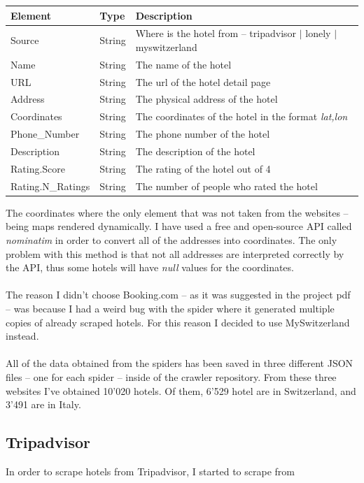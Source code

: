 \documentclass[unicode,11pt,a4paper,oneside,numbers=endperiod,openany]{scrartcl}
\begin{document}
\begin{table}[H]
	\centering
	\begin{tabular}{|l|l|l|} \hline 
		\textbf{Element} & \textbf{Type} & \textbf{Description}  \\ \hline
		Source & String & Where is the hotel from -- tripadvisor $|$ lonely $|$ myswitzerland \\
		Name & String & The name of the hotel \\
		URL & String & The url of the hotel detail page \\
		Address & String & The physical address of the hotel \\
		Coordinates & String & The coordinates of the hotel in the format \textit{lat,lon} \\
		Phone\_Number & String & The phone number of the hotel \\
		Description & String & The description of the hotel \\
		Rating.Score & String & The rating of the hotel out of 4 \\
		Rating.N\_Ratings & String & The number of people who rated the hotel \\
		\hline
	\end{tabular}
\end{table}

\noindent The coordinates where the only element that was not taken from the websites -- being maps rendered dynamically. I have used a free and open-source API called \textit{nominatim} in order to convert all of the addresses into coordinates. The only problem with this method is that not all addresses are interpreted correctly by the API, thus some hotels will have \textit{null} values for the coordinates. \\ \\
The reason I didn't choose Booking.com -- as it was suggested in the project pdf -- was because I had a weird bug with the spider where it generated multiple copies of already scraped hotels. For this reason I decided to use MySwitzerland instead. \\ \\
All of the data obtained from the spiders has been saved in three different JSON files -- one for each spider -- inside of the crawler repository. From these three websites I've obtained 10'020 hotels. Of them, 6'529 hotel are in Switzerland, and 3'491 are in Italy.

\subsection{Tripadvisor}
In order to scrape hotels from Tripadvisor, I started to scrape from
\end{document}
